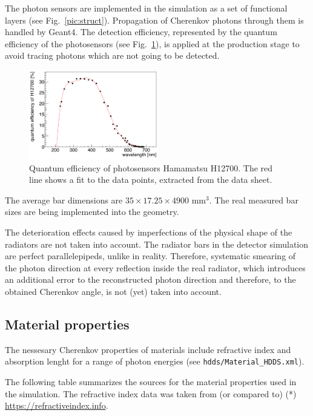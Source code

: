 \documentclass[11pt, a4paper]{article}
\begin{document}
The photon sensors are implemented in the simulation as a set of functional layers (see Fig.~\ref{pic:struct}). Propagation of Cherenkov photons through them is handled by Geant4. The detection efficiency, represented by the quantum efficiency of the photosensors (see Fig.~\ref{pic:qe}), is applied at the production stage to avoid tracing photons which are not going to be detected.

\begin{figure}[tb]
\centering
\includegraphics[width=0.5\textwidth]{pics/qe.png}
\caption{\label{pic:qe}
Quantum efficiency of photosensors Hamamatsu H12700. The red line shows a fit to the data points, extracted from the data sheet.
}
\end{figure}

The average bar dimensions are $35 \times 17.25 \times 4900 $ mm$^3$. The real measured bar sizes are being implemented into the geometry. 

The deterioration effects caused by imperfections of the physical shape of the radiators are not taken into account. The radiator bars in the detector simulation are perfect parallelepipeds, unlike in reality. Therefore, systematic smearing of the photon direction at every reflection inside the real radiator, which introduces an additional error to the reconstructed photon direction and therefore, to the obtained Cherenkov angle, is not (yet) taken into account.

\subsection{Material properties}

The nessesary Cherenkov properties of materials include refractive index and absorption lenght for a range of photon energies (see \texttt{hdds/Material{\_}HDDS.xml}).

The following table summarizes the sources for the material properties used in the simulation. The refractive index data was taken from (or compared to) (*) \\ \url{https://refractiveindex.info}. 
\end{document}
